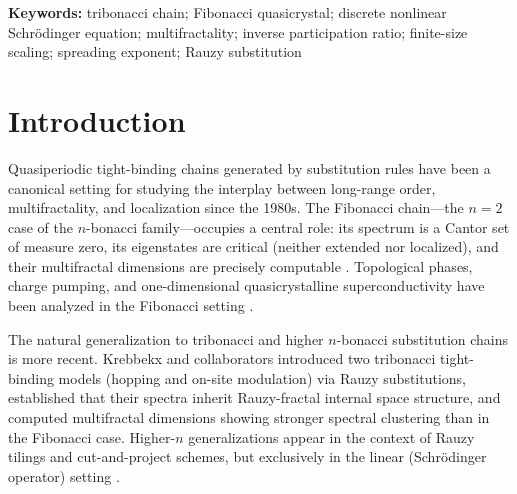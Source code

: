 \documentclass[12pt,a4paper]{article}
\begin{document}
\begin{abstract}
The characteristic decay constant of the tribonacci amplitude envelope,
$\eta \approx 1.839287$, is the Perron--Frobenius eigenvalue of the
tribonacci companion matrix, whose existence and key properties ($\eta > 1$,
strict antitonicity of $\eta^{-k}$) are formally verified in
Lean~4/Mathlib4 in the companion AXLE repository \cite{AXLE2026}. To our
knowledge, this is the first numerical study of DNLS dynamics on a
tribonacci substitution chain, and the present revision contributes the
first finite-size scaling and long-time saturation analysis identifying a
qualitative difference in nonlinear response between $n=2$ and $n=3$
substitution-generated quasicrystal models.
\end{abstract}

\textbf{Keywords:} tribonacci chain; Fibonacci quasicrystal; discrete
nonlinear Schr\"{o}dinger equation; multifractality; inverse participation
ratio; finite-size scaling; spreading exponent; Rauzy substitution

\section{Introduction}

Quasiperiodic tight-binding chains generated by substitution rules have been
a canonical setting for studying the interplay between long-range order,
multifractality, and localization since the 1980s. The Fibonacci chain---the
$n=2$ case of the $n$-bonacci family---occupies a central role: its spectrum
is a Cantor set of measure zero, its eigenstates are critical (neither
extended nor localized), and their multifractal dimensions are precisely
computable \cite{Kohmoto1983,Ostlund1983,Luck1989,Mace2017}. Topological
phases, charge pumping, and one-dimensional quasicrystalline superconductivity
have been analyzed in the Fibonacci setting \cite{Kraus2012,Lang2012}.

The natural generalization to tribonacci and higher $n$-bonacci substitution
chains is more recent. Krebbekx and collaborators \cite{Krebbekx2023}
introduced two tribonacci tight-binding models (hopping and on-site
modulation) via Rauzy substitutions, established that their spectra inherit
Rauzy-fractal internal space structure, and computed multifractal dimensions
showing stronger spectral clustering than in the Fibonacci case.
Higher-$n$ generalizations appear in the context of Rauzy tilings and
cut-and-project schemes, but exclusively in the linear (Schr\"{o}dinger
operator) setting \cite{Bellissard1989,Damanik2008}.
\end{document}
